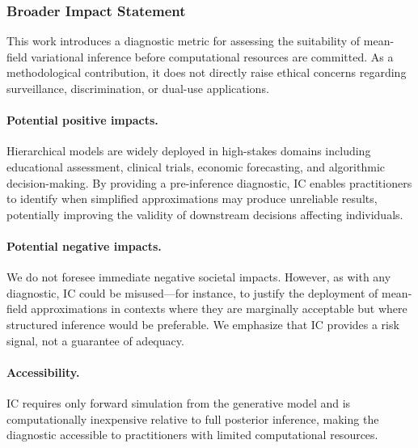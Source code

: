 \documentclass[10pt]{article} %
\theoremstyle{plain}
\theoremstyle{definition}
\begin{document}
\subsubsection*{Broader Impact Statement}

This work introduces a diagnostic metric for assessing the suitability of mean-field variational inference before computational resources are committed. As a methodological contribution, it does not directly raise ethical concerns regarding surveillance, discrimination, or dual-use applications.

\paragraph{Potential positive impacts.} Hierarchical models are widely deployed in high-stakes domains including educational assessment, clinical trials, economic forecasting, and algorithmic decision-making. By providing a pre-inference diagnostic, IC enables practitioners to identify when simplified approximations may produce unreliable results, potentially improving the validity of downstream decisions affecting individuals.

\paragraph{Potential negative impacts.} We do not foresee immediate negative societal impacts. However, as with any diagnostic, IC could be misused---for instance, to justify the deployment of mean-field approximations in contexts where they are marginally acceptable but where structured inference would be preferable. We emphasize that IC provides a risk signal, not a guarantee of adequacy.

\paragraph{Accessibility.} IC requires only forward simulation from the generative model and is computationally inexpensive relative to full posterior inference, making the diagnostic accessible to practitioners with limited computational resources.


\end{document}
